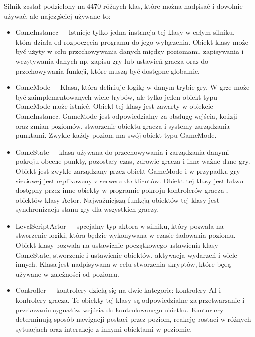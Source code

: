 \documentclass[12pt,twoside]{article}
\begin{document}
Silnik został podzielony na 4470 różnych klas, które można nadpisać i dowolnie
używać, ale najczęściej używane to:
\begin{itemize}
\item GameInstance –- Istnieje tylko jedna instancja tej klasy w całym silniku,
która działa od rozpoczęcia programu do jego wyłączenia. Obiekt klasy może być
użyty w celu przechowywania danych między poziomami, zapisywania i wczytywania
danych np. zapisu gry lub ustawień gracza oraz do przechowywania funkcji, które
muszą być dostępne globalnie. 

\item GameMode –- Klasa, która definiuje logikę w danym trybie gry. W grze może
być zaimplementowanych wiele trybów, ale tylko jeden obiekt typu GameMode może
istnieć. Obiekt tej klasy jest zawarty w obiekcie GameInstance. GameMode jest
odpowiedzialny za obsługę wejścia, kolizji oraz zmian poziomów, stworzenie
obiektu gracza i systemy zarządzania punktami. Zwykle każdy poziom ma swój
obiekt typu GameMode. 

\item GameState –- klasa używana do przechowywania i zarządzania danymi pokroju
obecne punkty, pozostały czas, zdrowie gracza i inne ważne dane gry. Obiekt jest
zwykle zarządzany przez obiekt GameMode i w przypadku gry sieciowej jest
replikowany z serwera do klientów. Obiekt tej klasy jest łatwo dostępny przez
inne obiekty w programie pokroju kontrolerów gracza i obiektów klasy Actor.
Najważniejszą funkcją obiektów tej klasy jest synchronizacja stanu gry dla
wszystkich graczy. 

\item LevelScriptActor –- specjalny typ aktora w silniku, który pozwala na
stworzenie logiki, która będzie wykonywana w czasie ładowania poziomu. Obiekt
klasy pozwala na ustawienie początkowego ustawienia klasy GameState, stworzenie
i ustawienie obiektów, aktywacja wydarzeń i wiele innych. Klasa jest nadpisywana
w celu stworzenia skryptów, które będą używane w zależności od poziomu. 

\item Controller –- kontrolery dzielą się na dwie kategorie: kontrolery AI i
kontrolery gracza. Te obiekty tej klasy są odpowiedzialne za przetwarzanie i
przekazanie sygnałów wejścia do kontrolowanego obietku. Kontorlery determinują
sposób nawigacji postaci przez poziom, reakcję postaci w różnych sytuacjach oraz
interakcje z innymi obiektami w poziomie. 



\end{itemize}
\end{document}
